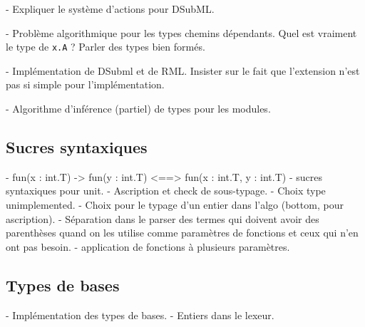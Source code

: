 - Expliquer le système d'actions pour DSubML.

- Problème algorithmique pour les types chemins dépendants. Quel est vraiment le
type de \verb|x.A| ? Parler des types bien formés.

- Implémentation de DSubml et de RML. Insister sur le fait que l'extension n'est
pas si simple pour l'implémentation.

- Algorithme d'inférence (partiel) de types pour les modules.

\subsection{Sucres syntaxiques}

- fun(x : int.T) -> fun(y : int.T) <==> fun(x : int.T, y : int.T)
- sucres syntaxiques pour unit.
- Ascription et check de sous-typage.
- Choix type unimplemented.
- Choix pour le typage d'un entier dans l'algo (bottom, pour ascription).
- Séparation dans le parser des termes qui doivent avoir des parenthèses quand
on les utilise comme paramètres de fonctions et ceux qui n'en ont pas besoin.
- application de fonctions à plusieurs paramètres.

\subsection{Types de bases}

- Implémentation des types de bases.
- Entiers dans le lexeur.